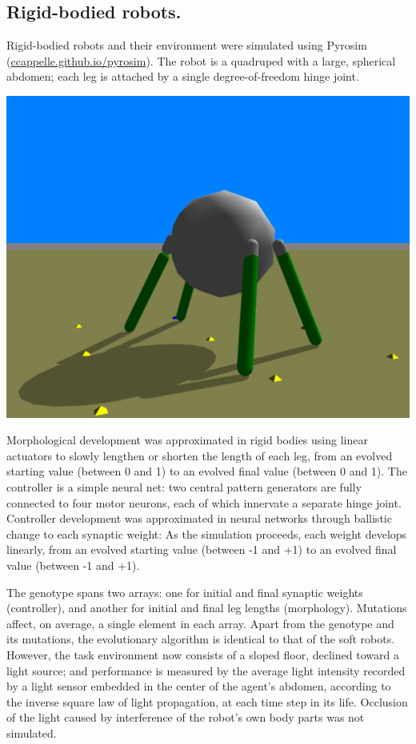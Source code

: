 \subsection*{Rigid-bodied robots.}

Rigid-bodied robots and their environment were simulated using Pyrosim
(\href{https://ccappelle.github.io/pyrosim/}{\color{blue}ccappelle.github.io/pyrosim}).
The robot is a quadruped with a large, spherical abdomen; each leg is attached by a single degree-of-freedom hinge joint.\\[0.75em]
\centerline{\includegraphics[width=0.4\linewidth]{Chapter04/rigid-body.png}}

\vspace{0.75em}
Morphological development was approximated in rigid bodies using linear actuators to slowly lengthen or shorten the length of each leg, from an evolved starting value (between 0 and 1) to an evolved final value (between 0 and 1).
The controller is a simple neural net: two central pattern generators are fully connected to four motor neurons, each of which innervate a separate hinge joint.
Controller development was approximated in neural networks through ballistic change to each synaptic weight: As the simulation proceeds, each weight develops linearly, from an evolved starting value (between -1 and +1) to an evolved final value (between -1 and +1).


The genotype spans two arrays: one for initial and final synaptic weights (controller), and another for initial and final leg lengths (morphology). 
Mutations affect, on average, a single element in each array.
Apart from the genotype and its mutations, the evolutionary algorithm is identical to that of the soft robots.
However, the task environment now consists of a sloped floor, declined toward a light source; and
performance is measured by the average light intensity recorded by a light sensor embedded in the center of the agent's abdomen, according to the inverse square law of light propagation, at each time step in its life. Occlusion of the light caused by interference of the robot's own body parts was not simulated.


